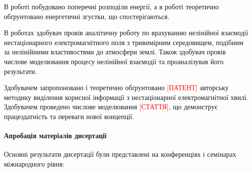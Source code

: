 В роботі \cite{my:Vesnik2017-2} побудовано поперечні розподіли енергії, а
в роботі \cite{imp:Vesnik2018} теоретично обґрунтовано енергетичні згустки, 
що спостерігаються.

В роботах \cite{my:Vesnik2015, my:Vesnik2017, my:Vesnik2017-2, my:MMET2014, 
my:UWBUSIS2014, my:ICATT2015, my:UWBUSIS2016, my:KPI2016, my:DIPED2019} 
здобувач провів аналітичну роботу по врахуванню нелінійної взаємодії 
нестаціонарного електромагнітного поля з тривимірним середовищем, 
подібним за нелінійними властивостями до атмосфери землі. Також здобувач
провів числове моделювання процесу нелінійної взаємодії та проаналізував 
його результати.

Здобувачем запропоновано \cite{my:UWBUSIS2018} і теоретично обґрунтовано
\textcolor{red}{[ПАТЕНТ]} авторську методику виділення корисної інформації 
з нестаціонарної електромагнітної хвилі. Здобувачем проведено числове 
моделювання \textcolor{red}{[СТАТТЯ]}, що демонструє працездатність та 
переваги нової концепції.

\paragraph{Апробація матеріалів дисертації}

Основні результати дисертації були представлені на конференціях і 
семінарах міжнародного рівня:

